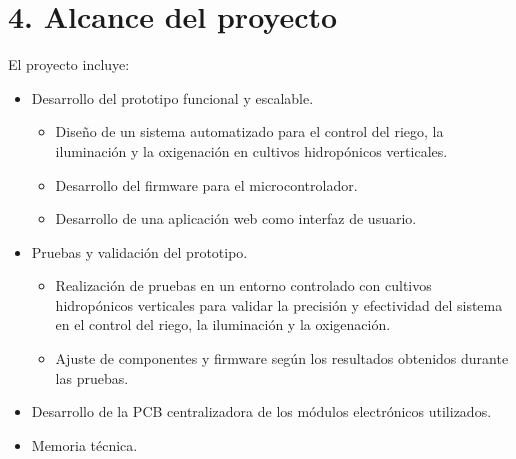 \documentclass[
11pt, %
]{charter}
\begin{document}
\section{4. Alcance del proyecto}
\label{sec:alcance}




El proyecto incluye:
\begin{itemize}
	\item Desarrollo del prototipo funcional y escalable.
		\begin{itemize}
		\item Diseño de un sistema automatizado para el control del riego, la iluminación y la oxigenación en cultivos hidropónicos verticales.
		\item Desarrollo del firmware para el microcontrolador.
		\item Desarrollo de una aplicación web como interfaz de usuario.
		\end{itemize}
	\item Pruebas y validación del prototipo.
		\begin{itemize}
		\item Realización de pruebas en un entorno controlado con cultivos hidropónicos verticales para validar la precisión y efectividad del sistema en el control del riego, la iluminación y la oxigenación.
		\item Ajuste de componentes y firmware según los resultados obtenidos durante las pruebas.
		\end{itemize}
	\item Desarrollo de la PCB centralizadora de los módulos electrónicos utilizados.
	\item Memoria técnica.
	
\end{itemize}
\end{document}
